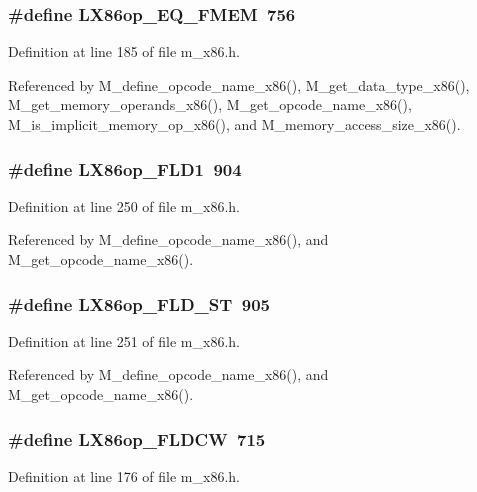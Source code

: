 \subsubsection{\setlength{\rightskip}{0pt plus 5cm}\#define LX86op\_\-EQ\_\-FMEM~756}\label{m__x86_8h_b84f2d3d52d4bc44364db41659185308}




Definition at line 185 of file m\_\-x86.h.

Referenced by M\_\-define\_\-opcode\_\-name\_\-x86(), M\_\-get\_\-data\_\-type\_\-x86(), M\_\-get\_\-memory\_\-operands\_\-x86(), M\_\-get\_\-opcode\_\-name\_\-x86(), M\_\-is\_\-implicit\_\-memory\_\-op\_\-x86(), and M\_\-memory\_\-access\_\-size\_\-x86().
\subsubsection{\setlength{\rightskip}{0pt plus 5cm}\#define LX86op\_\-FLD1~904}\label{m__x86_8h_615e48526b698e6ed8cf9bcacfa77984}




Definition at line 250 of file m\_\-x86.h.

Referenced by M\_\-define\_\-opcode\_\-name\_\-x86(), and M\_\-get\_\-opcode\_\-name\_\-x86().
\subsubsection{\setlength{\rightskip}{0pt plus 5cm}\#define LX86op\_\-FLD\_\-ST~905}\label{m__x86_8h_3b8e3af6c04d4891af524e71ee2a43ae}




Definition at line 251 of file m\_\-x86.h.

Referenced by M\_\-define\_\-opcode\_\-name\_\-x86(), and M\_\-get\_\-opcode\_\-name\_\-x86().
\subsubsection{\setlength{\rightskip}{0pt plus 5cm}\#define LX86op\_\-FLDCW~715}\label{m__x86_8h_251252df626417a1a15a6b055c8b9bd5}




Definition at line 176 of file m\_\-x86.h.

